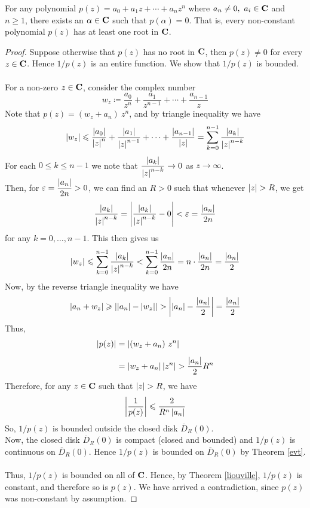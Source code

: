 \begin{theorem}
For any polynomial $p(z) = a_0 + a_1z + \cdots + a_nz^n$ where $a_n \neq 0,\ a_i \in \mathbf C$ and $n \geq 1$, there exists an $\alpha \in \mathbf C$ such that $p(\alpha) = 0$. That is, every non-constant polynomial $p(z)$ has at least one root in $\mathbf C$. 
\end{theorem}
\begin{proof}
Suppose otherwise that $p(z)$ has no root in $\mathbf C$, then $p(z) \neq 0$ for every $z \in \mathbf C$. Hence $1/p(z)$ is an entire function. We show that $1/p(z)$ is bounded.\\
\\
For a non-zero $z \in \mathbf C$, consider the complex number
\[w_z \coloneqq \frac{a_0}{z^n} + \frac{a_1}{z^{n-1}} + \cdots + \frac{a_{n-1}}{z}\]
Note that $p(z) = (w_z + a_n)\ z^n$, and by triangle inequality we have
\[\left\lvert w_z\right\rvert \leqslant \frac{\left\lvert a_0\right\rvert}{\left\lvert z\right\rvert^n} + \frac{\left\lvert a_1\right\rvert}{\left\lvert z\right\rvert^{n-1}} + \cdots + \frac{\left\lvert a_{n-1}\right\rvert}{\left\lvert z\right\rvert} = \sum_{k=0}^{n-1}\frac{\left\lvert a_k\right\rvert}{\left\lvert z\right\rvert^{n-k}}\]
For each $0 \leq k \leq n-1$ we note that $\dfrac{\left\lvert a_k\right\rvert}{\left\lvert z\right\rvert^{n-k}} \to 0$ as $z \to \infty$.\\[0.5em]
Then, for $\varepsilon = \dfrac{\left\lvert a_n\right\rvert}{2n} > 0$, we can find an $R > 0$ such that whenever $\left\lvert z\right\rvert > R$, we get
\[\frac{\left\lvert a_k\right\rvert}{\left\lvert z\right\rvert^{n-k}} = \left\lvert\frac{\left\lvert a_k\right\rvert}{\left\lvert z\right\rvert^{n-k}} - 0\right\rvert < \varepsilon = \frac{\left\lvert a_n\right\rvert}{2n}\]
for any $k = 0,\ldots,n-1$. This then gives us
\[\left\lvert w_z\right\rvert \leqslant \sum_{k=0}^{n-1}\frac{\left\lvert a_k\right\rvert}{\left\lvert z\right\rvert^{n-k}} < \sum_{k=0}^{n-1}\frac{\left\lvert a_n\right\rvert}{2n} = n\cdot \frac{\left\lvert a_n\right\rvert}{2n} = \frac{\left\lvert a_n\right\rvert}{2}\]
Now, by the reverse triangle inequality we have
\[\left\lvert a_n + w_z\right\rvert \geqslant \left\lvert\left\lvert a_n\right\rvert - \left\lvert w_z\right\rvert\right\rvert > \left\lvert\left\lvert a_n\right\rvert - \frac{\left\lvert a_n\right\rvert}{2}\right\rvert = \frac{\left\lvert a_n\right\rvert}{2}\]
Thus, 
\begin{align*}
\left\lvert p(z)\right\rvert &= \left\lvert(w_z + a_n)\ z^n\right\rvert\\[0.5em]
&= \left\lvert w_z + a_n\right\rvert\left\lvert z^n\right\rvert > \frac{\left\lvert a_n\right\rvert}{2}R^n
\end{align*}
Therefore, for any $z \in \mathbf C$ such that $\left\lvert z\right\rvert > R$, we have
\[\left\lvert\frac{1}{p(z)}\right\rvert \leqslant \frac{2}{R^n\left\lvert a_n\right\rvert}\]
So, $1/p(z)$ is bounded outside the closed disk $\overline{D}_R(0)$.\\[0.5em]
Now, the closed disk $\overline{D}_R(0)$ is compact (closed and bounded) and $1/p(z)$ is continuous on $\overline{D}_R(0)$. Hence $1/p(z)$ is bounded on $\overline{D}_R(0)$ by Theorem \ref{evt}.\\
\\
Thus, $1/p(z)$ is bounded on all of $\mathbf C$. Hence, by Theorem \ref{liouville}, $1/p(z)$ is constant, and therefore so is $p(z)$. We have arrived a contradiction, since $p(z)$ was non-constant by assumption. 
\end{proof}

